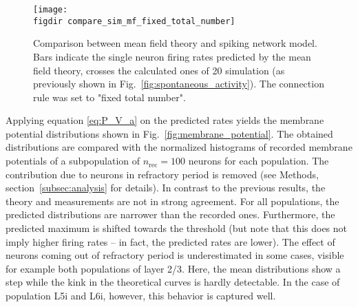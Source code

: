 \begin{figure}[tb]
    \centering
    \texttt{[image: \\figdir compare\_sim\_mf\_fixed\_total\_number]}
    \caption{
        Comparison between mean field theory and spiking network model. 
        Bars indicate the single neuron firing rates predicted by the mean field 
        theory, crosses the calculated ones of 20 simulation (as previously shown in
        Fig.~\ref{fig:spontaneous_activity}). The connection
        rule was set to "fixed total number".
    }
    \label{fig:compare_sim_mf_fixed_total_number}
\end{figure}

Applying equation \eqref{eq:P_V_a} on the predicted rates yields the 
membrane potential distributions shown in 
Fig.~\ref{fig:membrane_potential}. 
The obtained distributions are compared with the normalized histograms of recorded 
membrane potentials of a subpopulation of $n_\text{rec} = 100$ neurons for 
each population. The contribution due to neurons in refractory period is removed
(see Methods, section~\ref{subsec:analysis} for details). 
In contrast to the previous results, the theory and measurements are not in strong agreement. 
For all populations, the predicted distributions are narrower than the recorded ones.
Furthermore, the predicted maximum is shifted towards the threshold (but note that
this does not imply higher firing rates -- in fact, the predicted rates are lower). 
The effect
of neurons coming out of refractory period is underestimated in some cases, 
visible for example both populations of layer 2/3. Here, the mean distributions 
show a step while the kink in the theoretical curves is hardly detectable. 
In the case of population L5i and L6i, however, this behavior is captured well. 

